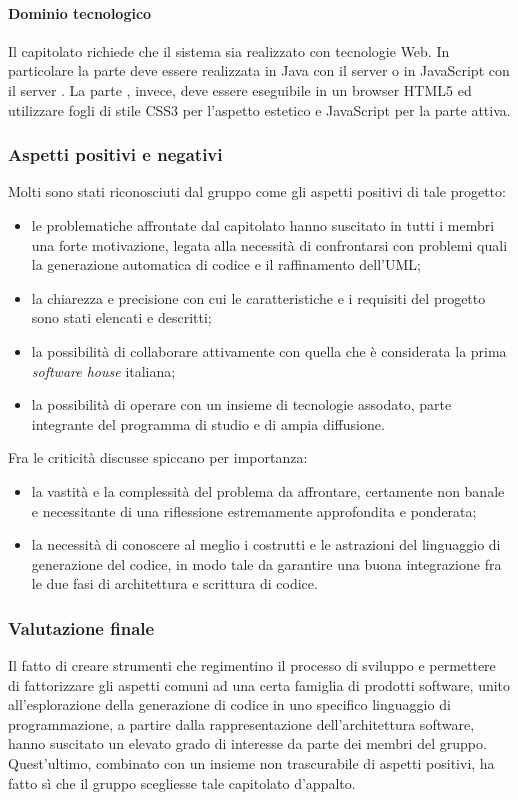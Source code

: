 			\paragraph{Dominio tecnologico}
			Il capitolato richiede che il sistema sia realizzato con tecnologie Web. In particolare la parte  deve essere realizzata in Java con il server 
			 o in JavaScript con il server . La parte , invece, deve essere eseguibile in un browser HTML5 ed utilizzare fogli di stile CSS3 per l'aspetto estetico e JavaScript per la parte attiva.
		
		\subsubsection{Aspetti positivi e negativi}
		Molti sono stati riconosciuti dal gruppo come gli aspetti positivi di tale progetto:
		\begin{itemize}
			\item le problematiche affrontate dal capitolato hanno suscitato in tutti i membri una forte motivazione, legata alla necessità di confrontarsi 
			con problemi quali la generazione automatica di codice e il raffinamento dell'UML;
			\item la chiarezza e precisione con cui le caratteristiche e i requisiti del progetto sono stati elencati e descritti;
			\item la possibilità di collaborare attivamente con quella che è considerata 
			la prima \emph{software house} italiana;
			\item la possibilità di operare con un insieme di tecnologie assodato, parte integrante del programma di studio e di ampia diffusione.
		\end{itemize}
		Fra le criticità discusse spiccano per importanza:
		\begin{itemize}
			\item la vastità e la complessità del problema da affrontare, certamente non banale e necessitante di una riflessione 
			estremamente approfondita e ponderata;
			\item la necessità di conoscere al meglio i costrutti e le astrazioni del linguaggio di generazione del codice, 
			in modo tale da garantire una buona integrazione fra le due fasi di architettura e scrittura di codice.
		\end{itemize}
		\subsubsection{Valutazione finale} 
		Il fatto di creare strumenti che regimentino il processo di sviluppo e permettere di fattorizzare gli aspetti comuni ad una certa famiglia di 
		prodotti software, unito all'esplorazione della generazione di codice in uno specifico linguaggio di programmazione, a partire dalla rappresentazione 
		dell'architettura software, hanno suscitato un elevato grado di interesse da parte dei membri del gruppo. Quest'ultimo, combinato con un insieme non 
		trascurabile di aspetti positivi, ha fatto sì che il gruppo \hx{} scegliesse tale capitolato d'appalto.
	




